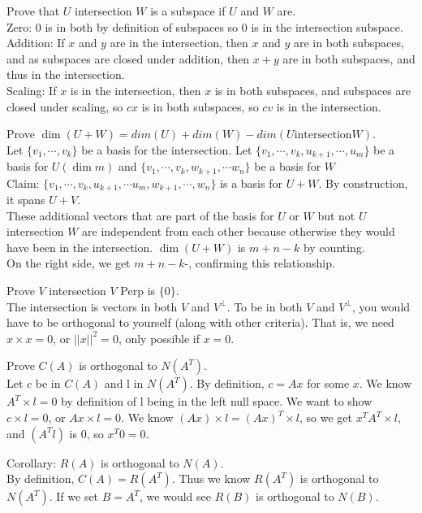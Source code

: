 \documentclass[12pt]{article}
\begin{document}
Prove that $U$ intersection $W$ is a subspace if $U$ and $W$ are.\\
Zero: 0 is in both by definition of subspaces so 0 is in the intersection subspace.\\
Addition: If $x$ and $y$ are in the intersection, then $x$ and $y$ are in both subspaces, and as
subspaces are closed under addition, then $x+y$ are in both subspaces, and thus in the
intersection.\\
Scaling: If $x$ is in the intersection, then $x$ is in both subspaces, and subspaces are closed under
scaling, so $cx$ is in both subspaces, so $cv$ is in the intersection.

Prove $\dim(U+W) = dim(U) + dim(W) - dim(U \text{intersection} W)$.\\
Let  $\{v_1,\cdots, v_k\}$ be a basis for the intersection. Let $\{v_1,\cdots,v_k,u_{k+1},\cdots,u_m\}$ be a basis for $U (\dim m)$
and $\{v_1,\cdots,v_k,w_{k+1},\cdots w_n\}$ be a basis for $W$\\
Claim: $\{v_1,\cdots,v_k,u_{k+1}, \cdots u_m,w_{k+1},\cdots, w_n\}$ is a basis for $U+W$. By construction, it spans $U+V$.\\
These additional vectors that are part of the basis for $U$ or $W$ but not $U$ intersection $W$ are
independent from each other because otherwise they would have been in the intersection.
$\dim(U+W)$ is $m+n-k$ by counting.\\
On the right side, we get $m+n-k$-, confirming this relationship.


Prove $V$ intersection $V$ Perp is $\{0\}$.\\
The intersection is vectors in both $V$ and $V^\perp$. To be in both $V$ and $V^\perp$, you would have to
be orthogonal to yourself (along with other criteria). That is, we need $x \times x = 0$, or $||x||^2 = 0$, only possible if $x=0$.


Prove $C(A)$ is orthogonal to $N(A^T)$.\\
Let $c$ be in $C(A)$ and l in $N(A^T)$. By definition, $c = Ax$ for some $x$. We know $A^T \times l=0$ by definition of l being in the left null space. We want to show $c \times l=0$, or $Ax \times l = 0$. We know $(Ax)\times l = (Ax)^T \times l$,
so we get $x^T A^T \times l$, and $(A^T l)$ is 0, so $x^T 0 = 0$.


Corollary: $R(A)$ is orthogonal to $N(A)$.\\
By definition, $C(A) = R(A^T)$. Thus we know $R(A^T)$ is orthogonal to $N(A^T)$. If we set $B = A^T$,
we would see $R(B)$ is orthogonal to $N(B)$.
\end{document}

